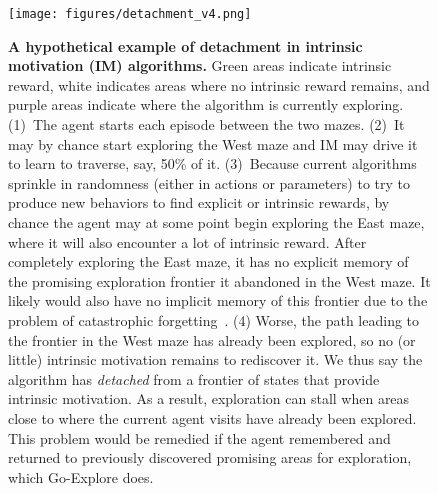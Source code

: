 \documentclass{article}
\begin{document}
\begin{figure}
    \centering
    \texttt{[image: figures/detachment\_v4.png]}
    \caption{\textbf{A hypothetical example of detachment in intrinsic motivation (IM) algorithms.} Green areas indicate intrinsic reward, white indicates areas where no intrinsic reward remains, and purple areas indicate where the algorithm is currently exploring. (1)~The agent starts each episode between the two mazes. (2)~It may by chance start exploring the West maze and IM may drive it to learn to traverse, say, 50\% of it. (3)~Because current algorithms sprinkle in randomness (either in actions or parameters) to try to produce new behaviors to find explicit or intrinsic rewards, by chance the agent may at some point begin exploring the East maze, where it will also encounter a lot of intrinsic reward. After completely exploring the East maze, it has no explicit memory of the promising exploration frontier it abandoned in the West maze. It likely would also have no implicit memory of this frontier due to the problem of catastrophic forgetting~\cite{velez2017diffusion, ellefsen2015neural, kirkpatrick2017overcoming,french1999catastrophic}. (4)
    Worse, the path leading to the frontier in the West maze has already been explored, so no (or little) intrinsic motivation remains to rediscover it. We thus say the algorithm has \emph{detached} from a frontier of states that provide intrinsic motivation. As a result, exploration can stall when areas close to where the current agent visits have already been explored. This problem would be remedied if the agent remembered and returned to previously discovered promising areas for exploration, which Go-Explore does. }
    \label{fig:detachment}
\end{figure}
\end{document}
